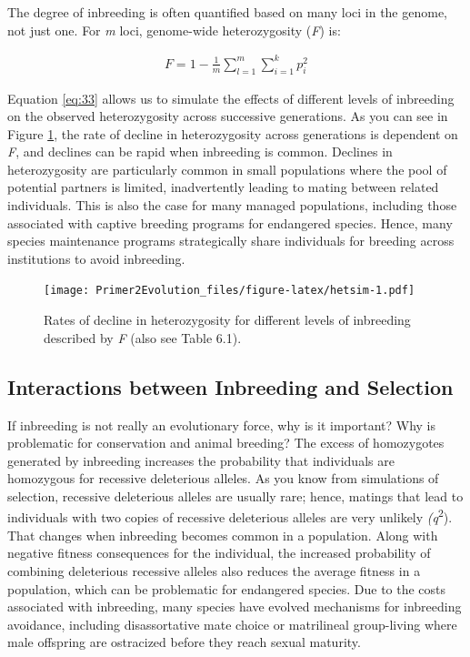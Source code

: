 \documentclass[
]{book}
\begin{document}
The degree of inbreeding is often quantified based on many loci in the genome, not just one. For \emph{m} loci, genome-wide heterozygosity (\emph{F}) is:

\begin{align} 
F = 1-\frac{1}{m} \sum_{l=1}^m \sum_{i=1}^k p_i^2 \label{eq:36}
\end{align}

Equation \eqref{eq:33} allows us to simulate the effects of different levels of inbreeding on the observed heterozygosity across successive generations. As you can see in Figure \ref{fig:hetsim}, the rate of decline in heterozygosity across generations is dependent on \emph{F}, and declines can be rapid when inbreeding is common. Declines in heterozygosity are particularly common in small populations where the pool of potential partners is limited, inadvertently leading to mating between related individuals. This is also the case for many managed populations, including those associated with captive breeding programs for endangered species. Hence, many species maintenance programs strategically share individuals for breeding across institutions to avoid inbreeding.

\begin{figure}
\centering
\texttt{[image: Primer2Evolution\_files/figure-latex/hetsim-1.pdf]}
\caption{\label{fig:hetsim}Rates of decline in heterozygosity for different levels of inbreeding described by \emph{F} (also see Table 6.1).}
\end{figure}

\hypertarget{interactions-between-inbreeding-and-selection}{%
\subsection{Interactions between Inbreeding and Selection}\label{interactions-between-inbreeding-and-selection}}

If inbreeding is not really an evolutionary force, why is it important? Why is problematic for conservation and animal breeding? The excess of homozygotes generated by inbreeding increases the probability that individuals are homozygous for recessive deleterious alleles. As you know from simulations of selection, recessive deleterious alleles are usually rare; hence, matings that lead to individuals with two copies of recessive deleterious alleles are very unlikely \emph{(q}\textsuperscript{2}). That changes when inbreeding becomes common in a population. Along with negative fitness consequences for the individual, the increased probability of combining deleterious recessive alleles also reduces the average fitness in a population, which can be problematic for endangered species. Due to the costs associated with inbreeding, many species have evolved mechanisms for inbreeding avoidance, including disassortative mate choice or matrilineal group-living where male offspring are ostracized before they reach sexual maturity.
\end{document}
